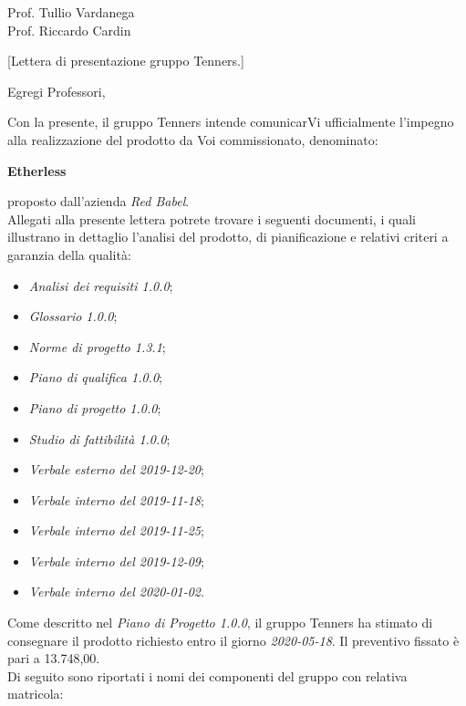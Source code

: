 \begin{letter}{\begin{flushright}
			Prof. Tullio Vardanega \\
			Prof. Riccardo Cardin 
	\end{flushright}}[Lettera di presentazione gruppo Tenners.]
\opening[Padova, ]{Egregi Professori,}
	\noindent Con la presente, il gruppo Tenners intende comunicarVi ufficialmente l'impegno alla realizzazione del prodotto da Voi commissionato, denominato:
	\begin{center}
		\textbf{Etherless}
	\end{center}
    proposto dall'azienda \textit{Red Babel}. \\
    \noindent Allegati alla presente lettera potrete trovare i seguenti documenti, i quali illustrano in dettaglio l'analisi del prodotto, di pianificazione e relativi criteri a garanzia della qualità:
    \begin{itemize}
    	\item \textit{Analisi dei requisiti 1.0.0\docs};
    	\item \textit{Glossario 1.0.0\docs};
    	\item \textit{Norme di progetto 1.3.1\docs};
    	\item \textit{Piano di qualifica 1.0.0\docs};
    	\item \textit{Piano di progetto 1.0.0\docs};
    	\item \textit{Studio di fattibilità 1.0.0\docs};
    	\item \textit{Verbale esterno del 2019-12-20\docs};
    	\item \textit{Verbale interno del 2019-11-18\docs};
    	\item \textit{Verbale interno del 2019-11-25\docs};
    	\item \textit{Verbale interno del 2019-12-09\docs};
    	\item \textit{Verbale interno del 2020-01-02\docs}.
    \end{itemize}
    Come descritto nel \textit{Piano di Progetto 1.0.0}\docs, il gruppo Tenners ha stimato di consegnare il prodotto richiesto entro il giorno \textit{2020-05-18}. Il preventivo fissato è pari a 13.748,00\officialeuro.\\ 
    \noindent Di seguito sono riportati i nomi dei componenti del gruppo con relativa matricola:
    \begin{center}
    	\renewcommand{\arraystretch}{1.8}
    	

\end{center}
\end{letter}
